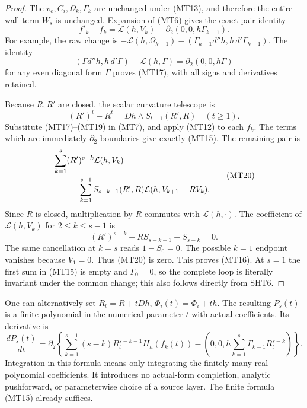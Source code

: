 \begin{proof}
The $v_e,C_i,\Omega_k,\Gamma_k$ are unchanged under (MT13), and
therefore the entire wall term $W_s$ is unchanged.  Expansion of (MT6)
gives the exact pair identity
\[
 f'_k-f_k=\mathcal L(h,V_k)
                         -\partial_2(0,0,h\Gamma_{k-1}).
 \tag{MT17}
\]
For example, the raw change is
$-\mathcal L(h,\Omega_{k-1})
 -(\Gamma_{k-1}d''h,h\,d'\Gamma_{k-1})$.
The identity
\[
 (\Gamma d''h,h\,d'\Gamma)+\mathcal L(h,\Gamma)
                      =\partial_2(0,0,h\Gamma)
 \tag{MT18}
\]
for any even diagonal form $\Gamma$ proves (MT17), with all signs
and derivatives retained.

Because $R,R'$ are closed, the scalar curvature telescope is
\[
             (R')^t-R^t=Dh\wedge S_{t-1}(R',R)\quad(t\ge1).
 \tag{MT19}
\]
Substitute (MT17)--(MT19) in (MT7), and apply (MT12) to each $f_k$.
The terms which are immediately $\partial_2$ boundaries give
exactly (MT15).  The remaining pair is
\[
 \begin{split}
 &\sum_{k=1}^s(R')^{s-k}\mathcal L(h,V_k)\\
 &\hspace{7mm}-\sum_{k=1}^{s-1}S_{s-k-1}(R',R)
                                      \mathcal L(h,V_{k+1}-RV_k).
 \end{split}
 \tag{MT20}
\]
Since $R$ is closed, multiplication by $R$ commutes with
$\mathcal L(h,\cdot)$.  The coefficient of
$\mathcal L(h,V_k)$ for $2\le k\le s-1$ is
\[
              (R')^{s-k}+R S_{s-k-1}-S_{s-k}=0.
 \tag{MT21}
\]
The same cancellation at $k=s$ reads $1-S_0=0$.
The possible $k=1$ endpoint vanishes because $V_1=0$.
Thus (MT20) is zero.  This proves (MT16).  At $s=1$ the first
sum in (MT15) is empty and $\Gamma_0=0$, so the complete loop
is literally invariant under the common change; this also follows
directly from SHT6.
\end{proof}

One can alternatively set $R_t=R+tDh$, $\Phi_i(t)=\Phi_i+th$.
The resulting $P_s(t)$ is a finite polynomial in the numerical
parameter $t$ with actual coefficients.  Its derivative is
\[
 \frac{dP_s(t)}{dt}=\partial_2\left\{
 \sum_{k=1}^{s-1}(s-k)R_t^{s-k-1}H_h(f_k(t))
 -\left(0,0,h\sum_{k=1}^s\Gamma_{k-1}R_t^{s-k}\right)
                                  \right\}.
 \tag{MT22}
\]
Integration in this formula means only integrating the finitely many
real polynomial coefficients.  It introduces no actual-form
completion, analytic pushforward, or parameterwise choice of a
source layer.  The finite formula (MT15) already suffices.

